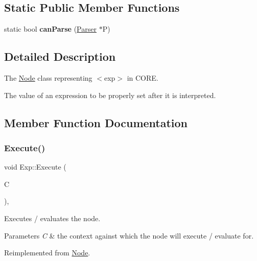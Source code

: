 \subsection*{Static Public Member Functions}
\begin{DoxyCompactItemize}
\item 
\mbox{\label{class_exp_a811b91b819c90648fe4787147390d5d6}} 
static bool {\bfseries can\+Parse} (\mbox{\hyperlink{class_parser}{Parser}} $\ast$P)
\end{DoxyCompactItemize}


\subsection{Detailed Description}
The \mbox{\hyperlink{class_node}{Node}} class representing {\ttfamily $<$exp$>$} in C\+O\+RE. 

The value of an expression to be properly set after it is interpreted. 

\subsection{Member Function Documentation}
\mbox{\label{class_exp_adceca06dcf880f8ad1008774f0bda91d}} 
\subsubsection{\texorpdfstring{Execute()}{Execute()}}
{\footnotesize\ttfamily void Exp\+::\+Execute (\begin{DoxyParamCaption}\item[{\mbox{\hyperlink{class_a_s_t_context}{A\+S\+T\+Context}} \&}]{C }\end{DoxyParamCaption})\hspace{0.3cm}{\ttfamily [override]}, {\ttfamily [virtual]}}

Executes / evaluates the node. 
\begin{DoxyParams}{Parameters}
{\em C} & the context against which the node will execute / evaluate for. \\
\hline
\end{DoxyParams}


Reimplemented from \mbox{\hyperlink{class_node_a27ad1ba81d2596817b361368282bcbfa}{Node}}.

\mbox{\label{class_exp_a1f5a3ad89d1aa43c746768d813582f39}} 
